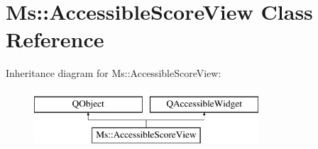\hypertarget{class_ms_1_1_accessible_score_view}{}\section{Ms\+:\+:Accessible\+Score\+View Class Reference}
\label{class_ms_1_1_accessible_score_view}
Inheritance diagram for Ms\+:\+:Accessible\+Score\+View\+:\begin{figure}[H]
\begin{center}
\leavevmode
\includegraphics[height=2.000000cm]{class_ms_1_1_accessible_score_view}
\end{center}
\end{figure}
